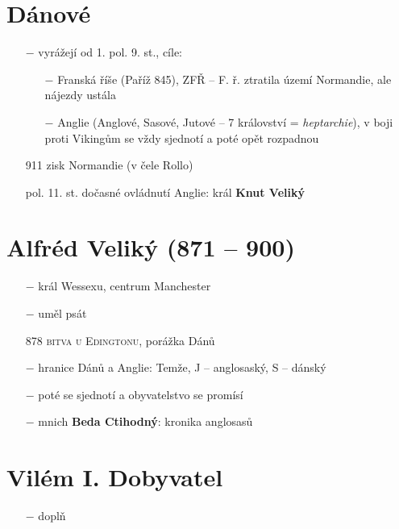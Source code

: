 \documentclass{article}
\begin{document}
\section*{Dánové}
\begin{itemize}
    \vspace{-0.5em}
    \setlength\itemsep{0.15em}
    \item[$-$] vyrážejí od 1. pol. 9. st., cíle:
    \begin{itemize}
        \vspace{-0.5em}
        \setlength\itemsep{0.15em}
        \item[$-$] Franská říše (Paříž 845), ZFŘ -- F. ř. ztratila území Normandie, ale nájezdy ustála
        \item[$-$] Anglie (Anglové, Sasové, Jutové -- 7 království = \textit{heptarchie}), v boji proti Vikingům se vždy sjednotí a poté opět rozpadnou
    \end{itemize}
    \item[911] zisk Normandie (v čele Rollo)
    \item[pol. 11. st.] dočasné ovládnutí Anglie: král \textbf{Knut Veliký}
\end{itemize}

\section*{Alfréd Veliký (871 -- 900)}
\begin{itemize}
    \vspace{-0.5em}
    \setlength\itemsep{0.15em}
    \item[$-$] král Wessexu, centrum Manchester
    \item[$-$] uměl psát
    \item[878] \textsc{bitva u Edingtonu}, porážka Dánů
    \item[$-$] hranice Dánů a Anglie: Temže, J -- anglosaský, S -- dánský
    \item[$-$] poté se sjednotí a obyvatelstvo se promísí
    \item[$-$] mnich \textbf{Beda Ctihodný}: kronika anglosasů
\end{itemize}

\section*{Vilém I. Dobyvatel}
\begin{itemize}
    \vspace{-0.5em}
    \setlength\itemsep{0.15em}
    \item[$-$] doplň
\end{itemize}
\end{document}
